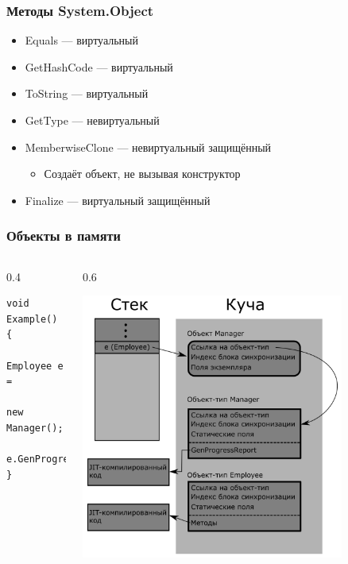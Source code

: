 \documentclass[xetex,mathserif,serif]{beamer}
\begin{document}
\begin{frame}
    \frametitle{Методы System.Object}
    \begin{itemize}
        \item Equals --- виртуальный
        \item GetHashCode --- виртуальный
        \item ToString --- виртуальный
        \item GetType --- невиртуальный
        \item MemberwiseClone --- невиртуальный защищённый
        \begin{itemize}
            \item Создаёт объект, не вызывая конструктор
        \end{itemize}
        \item Finalize --- виртуальный защищённый
    \end{itemize}
\end{frame}

\begin{frame}[fragile]
    \frametitle{Объекты в памяти}
    \begin{columns}
        \begin{column}{0.4\textwidth}
            \begin{verbatim}
void Example() 
{
    Employee e = 
        new Manager();
    e.GenProgressReport();
}
            \end{verbatim}
        \end{column}
        \begin{column}{0.6\textwidth}
            \begin{center}
                \includegraphics[width=0.8\textwidth]{objectInMemory.png}
            \end{center}
        \end{column}
    \end{columns}
\end{frame}
\end{document}
